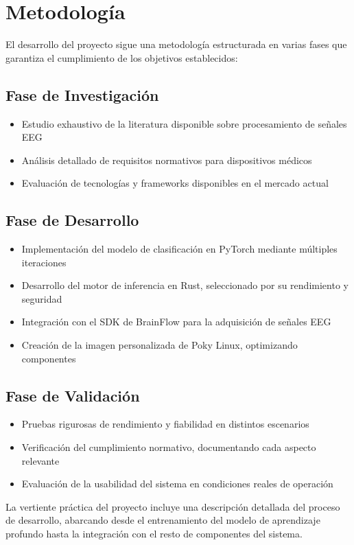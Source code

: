 \newpage
\section{Metodología}
El desarrollo del proyecto sigue una metodología estructurada en varias fases que garantiza el cumplimiento de los objetivos establecidos:

\subsection{Fase de Investigación}
\begin{itemize}
    \item Estudio exhaustivo de la literatura disponible sobre procesamiento de señales EEG
    \item Análisis detallado de requisitos normativos para dispositivos médicos
    \item Evaluación de tecnologías y frameworks disponibles en el mercado actual
\end{itemize}

\subsection{Fase de Desarrollo}
\begin{itemize}
    \item Implementación del modelo de clasificación en PyTorch mediante múltiples iteraciones
    \item Desarrollo del motor de inferencia en Rust, seleccionado por su rendimiento y seguridad
    \item Integración con el SDK de BrainFlow para la adquisición de señales EEG
    \item Creación de la imagen personalizada de Poky Linux, optimizando componentes
\end{itemize}

\subsection{Fase de Validación}
\begin{itemize}
    \item Pruebas rigurosas de rendimiento y fiabilidad en distintos escenarios
    \item Verificación del cumplimiento normativo, documentando cada aspecto relevante
    \item Evaluación de la usabilidad del sistema en condiciones reales de operación
\end{itemize}

La vertiente práctica del proyecto incluye una descripción detallada del proceso de desarrollo, abarcando desde el entrenamiento del modelo de aprendizaje profundo hasta la integración con el resto de componentes del sistema.